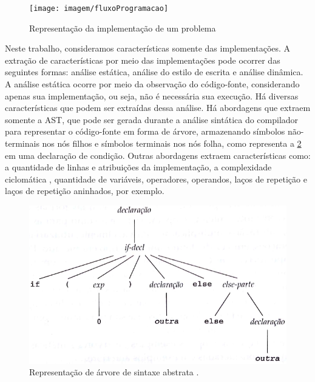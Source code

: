 			\begin{figure}[h]
				\centering
				\texttt{[image: imagem/fluxoProgramacao]}
				\caption{Representação da implementação de um problema}
				\label{fig:fluxoProgramacao}
			\end{figure}
			
			Neste trabalho, consideramos características somente das implementações.
			A extração de características por meio das implementações pode ocorrer das
			seguintes formas: análise estática, análise do estilo de escrita e análise dinâmica.
			A análise estática ocorre por meio da observação do código-fonte, considerando
			apenas sua implementação, ou seja, não é necessária sua execução. Há diversas
			características que podem ser extraídas dessa análise. Há abordagens que extraem
			somente a \ac{AST}, que pode ser gerada durante a análise
			sintática do compilador para representar o código-fonte em forma de árvore,
			armazenando símbolos não-terminais nos nós filhos e símbolos terminais nos
			nós folha, como representa a \cref{fig:AST} em uma declaração de condição.
			Outras abordagens extraem características como: a quantidade de linhas e
			atribuições da implementação, a complexidade ciclomática \cite{mccabe},
			quantidade de variáveis, operadores, operandos, laços de repetição e laços
			de repetição aninhados, por exemplo.
						
			\begin{figure}[h]
				\centering
				\includegraphics[width=0.7\linewidth]{imagem/AST}
				\caption[Representação de árvore de sintaxe abstrata]{Representação de árvore de sintaxe abstrata \cite{louden2004}.}
				\label{fig:AST}
			\end{figure}
			
